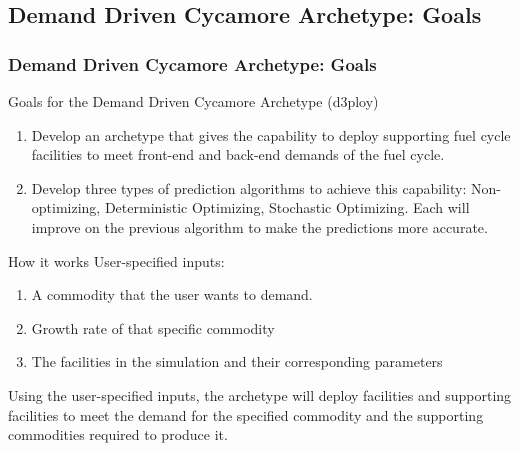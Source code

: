 \subsection{Demand Driven Cycamore Archetype: Goals}
\begin{frame}
  \frametitle{Demand Driven Cycamore Archetype: Goals}

\begin{block}{Goals for the Demand Driven Cycamore Archetype (d3ploy)}
\begin{enumerate}
	\item Develop an archetype that gives \Cyclus the capability to deploy supporting fuel cycle facilities to meet front-end and back-end demands of the fuel cycle. 
	\item Develop three types of prediction algorithms to achieve this capability: Non-optimizing, Deterministic Optimizing, Stochastic Optimizing. Each will improve on the previous algorithm to make the predictions more accurate. 
\end{enumerate}
\end{block}

\begin{block}{How it works}
User-specified inputs: 
\begin{enumerate}
	\item A commodity that the user wants to demand. 
	\item Growth rate of that specific commodity 
	\item The facilities in the simulation and their corresponding parameters
\end{enumerate}
Using the user-specified inputs, the archetype will deploy facilities and supporting facilities to meet the demand for the specified commodity and the supporting commodities required to produce it. 
\end{block}

\end{frame}

